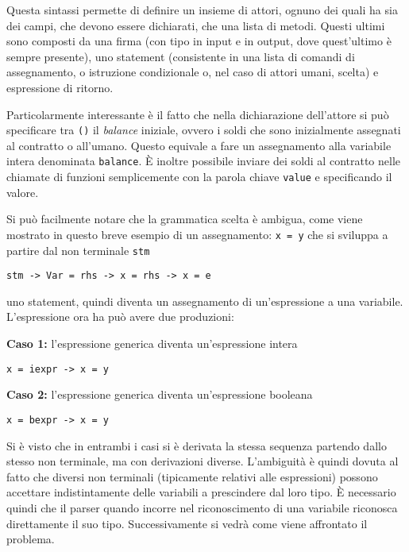 \documentclass[]{article}
\begin{document}
Questa sintassi permette di definire un insieme di attori, ognuno dei
quali ha sia dei campi, che devono essere dichiarati, che una lista di
metodi. Questi ultimi sono composti da una firma (con tipo in input e in
output, dove quest'ultimo è sempre presente), uno statement (consistente
in una lista di comandi di assegnamento, o istruzione condizionale o,
nel caso di attori umani, scelta) e espressione di ritorno.

Particolarmente interessante è il fatto che nella dichiarazione
dell'attore si può specificare tra \texttt{()} il \emph{balance}
iniziale, ovvero i soldi che sono inizialmente assegnati al contratto o
all'umano. Questo equivale a fare un assegnamento alla variabile intera
denominata \texttt{balance}. È inoltre possibile inviare dei soldi al
contratto nelle chiamate di funzioni semplicemente con la parola chiave
\texttt{value} e specificando il valore.

Si può facilmente notare che la grammatica scelta è ambigua, come viene
mostrato in questo breve esempio di un assegnamento: \texttt{x\ =\ y}
che si sviluppa a partire dal non terminale \texttt{stm}

\begin{verbatim}
stm -> Var = rhs -> x = rhs -> x = e
\end{verbatim}

uno statement, quindi diventa un assegnamento di un'espressione a una
variabile. L'espressione ora ha può avere due produzioni:

\textbf{Caso 1:} l'espressione generica diventa un'espressione intera

\begin{verbatim}
x = iexpr -> x = y
\end{verbatim}

\textbf{Caso 2:} l'espressione generica diventa un'espressione booleana

\begin{verbatim}
x = bexpr -> x = y
\end{verbatim}

Si è visto che in entrambi i casi si è derivata la stessa sequenza
partendo dallo stesso non terminale, ma con derivazioni diverse.
L'ambiguità è quindi dovuta al fatto che diversi non terminali
(tipicamente relativi alle espressioni) possono accettare
indistintamente delle variabili a prescindere dal loro tipo. È
necessario quindi che il parser quando incorre nel riconoscimento di una
variabile riconosca direttamente il suo tipo. Successivamente si vedrà
come viene affrontato il problema.
\end{document}
